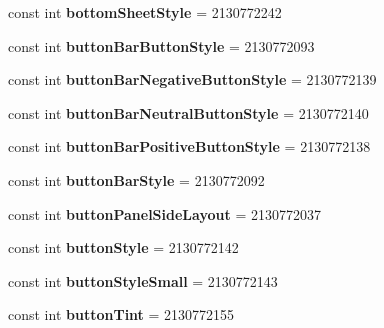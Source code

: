 \begin{DoxyCompactItemize}
const int {\bfseries bottom\+Sheet\+Style} = 2130772242
\item 
\mbox{\label{classXaria_1_1Resource_1_1Attribute_ac29ab60b683a84405eec6b6bab29faf7}} 
const int {\bfseries button\+Bar\+Button\+Style} = 2130772093
\item 
\mbox{\label{classXaria_1_1Resource_1_1Attribute_ae7ee8fb2c02b4654079068e82d2e5844}} 
const int {\bfseries button\+Bar\+Negative\+Button\+Style} = 2130772139
\item 
\mbox{\label{classXaria_1_1Resource_1_1Attribute_aebc20faca5a9d333121ee10aaefc1bec}} 
const int {\bfseries button\+Bar\+Neutral\+Button\+Style} = 2130772140
\item 
\mbox{\label{classXaria_1_1Resource_1_1Attribute_a8d04a8504cb9f7f5d54cfb698f3af0ec}} 
const int {\bfseries button\+Bar\+Positive\+Button\+Style} = 2130772138
\item 
\mbox{\label{classXaria_1_1Resource_1_1Attribute_ae05f339003dc9f41e1ae0b552c2184a1}} 
const int {\bfseries button\+Bar\+Style} = 2130772092
\item 
\mbox{\label{classXaria_1_1Resource_1_1Attribute_af3630ec4b050ee86cd209fb16e643ad0}} 
const int {\bfseries button\+Panel\+Side\+Layout} = 2130772037
\item 
\mbox{\label{classXaria_1_1Resource_1_1Attribute_a40333c9df4948e3928edb27b8cbfeb70}} 
const int {\bfseries button\+Style} = 2130772142
\item 
\mbox{\label{classXaria_1_1Resource_1_1Attribute_ab34d79ae9c12c16194d18f57ec6db70b}} 
const int {\bfseries button\+Style\+Small} = 2130772143
\item 
\mbox{\label{classXaria_1_1Resource_1_1Attribute_a4f25f7ffa974cfddf95c20dca0cad433}} 
const int {\bfseries button\+Tint} = 2130772155
\item 
\mbox{\label{classXaria_1_1Resource_1_1Attribute_a228d9b95363cf846edcfc54c31ff447a}} 

\end{DoxyCompactItemize}
